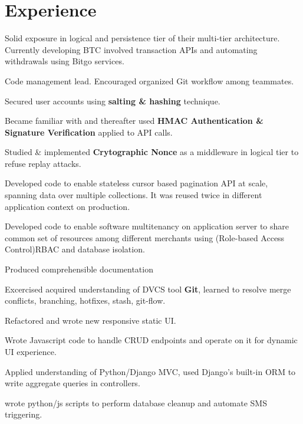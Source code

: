 \documentclass[]{deedy-resume-openfont}
\begin{document}
\begin{minipage}[t]{0.66\textwidth}


\section{Experience}

\vspace{\topsep} %
\begin{tightemize}
\item  Solid exposure in logical and persistence tier of their multi-tier architecture. Currently developing
  BTC involved transaction APIs and automating withdrawals using Bitgo services.
\item Code management lead. Encouraged organized Git workflow among teammates.
\item Secured user accounts using \textbf{salting \& hashing} technique.
\item Became familiar with and thereafter used \textbf{HMAC Authentication \& Signature Verification} applied to API calls.
\item Studied \& implemented \textbf{Crytographic Nonce} as a middleware in logical tier to refuse replay attacks.
\item Developed code to enable stateless cursor based pagination API at scale, spanning data over multiple
  collections. It was reused twice in different application context on production.
\item Developed code to enable software multitenancy on application server to share common set of resources among
  different merchants using (Role-based Access Control)RBAC and database isolation.
\item Produced comprehensible documentation
\end{tightemize}
\sectionsep

\vspace{\topsep} %
\begin{tightemize}
\item  Excercised acquired understanding of DVCS tool \textbf{Git}, learned to resolve merge conflicts, branching,
  hotfixes, stash, git-flow.
\item Refactored and wrote new responsive static UI.
\item Wrote Javascript code to handle CRUD endpoints and operate on it for dynamic UI experience.
\item Applied understanding of Python/Django MVC, used Django's built-in ORM to
  write aggregate queries in controllers.
\item wrote python/js scripts to perform database cleanup and automate SMS triggering.
\end{tightemize}
\sectionsep


\end{minipage}
\end{document}
